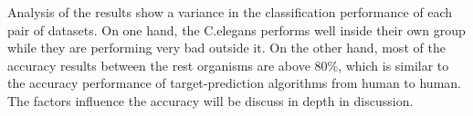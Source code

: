 \documentclass{bmcart}
\begin{document}
Analysis of the results show a variance in the classification performance of each pair of datasets. On one hand, the C.elegans performs well inside their own group while they are performing very bad outside it. On the other hand, most of the accuracy results between the rest organisms are above 80\%, which is similar to the accuracy performance of target-prediction algorithms from human to human. The factors influence the accuracy will be discuss in depth in discussion.

\end{document}
